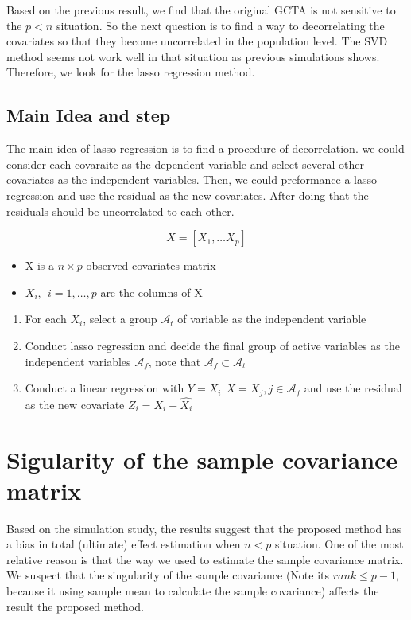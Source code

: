 \documentclass[]{article}
\providecommand{\tightlist}{%
  \setlength{\itemsep}{0pt}\setlength{\parskip}{0pt}}
\begin{document}
Based on the previous result, we find that the original GCTA is not
sensitive to the \(p < n\) situation. So the next question is to find a
way to decorrelating the covariates so that they become uncorrelated in
the population level. The SVD method seems not work well in that
situation as previous simulations shows. Therefore, we look for the
lasso regression method.

\subsection{Main Idea and step}\label{main-idea-and-step}

The main idea of lasso regression is to find a procedure of
decorrelation. we could consider each covaraite as the dependent
variable and select several other covariates as the independent
variables. Then, we could preformance a lasso regression and use the
residual as the new covariates. After doing that the residuals should be
uncorrelated to each other.

\[
  X = [X_1, \dots X_p]
\]

\begin{itemize}
\tightlist
\item
  X is a \(n \times p\) observed covariates matrix
\item
  \(X_i, ~~ i = 1, \dots, p\) are the columns of X
\end{itemize}

\begin{enumerate}
\def\labelenumi{\arabic{enumi}.}
\tightlist
\item
  For each \(X_i\), select a group \(\mathcal{A}_t\) of variable as the
  independent variable
\item
  Conduct lasso regression and decide the final group of active
  variables as the independent variables \(\mathcal{A}_f\), note that
  \(\mathcal{A}_f \subset \mathcal{A}_t\)
\item
  Conduct a linear regression with
  \(Y = X_i ~~ X = X_j, j\in\mathcal{A}_f\) and use the residual as the
  new covariate \(Z_i = X_i - \hat{X_i}\)
\end{enumerate}

\section{Sigularity of the sample covariance
matrix}\label{sigularity-of-the-sample-covariance-matrix}

Based on the simulation study, the results suggest that the proposed
method has a bias in total (ultimate) effect estimation when \(n<p\)
situation. One of the most relative reason is that the way we used to
estimate the sample covariance matrix. We suspect that the singularity
of the sample covariance (Note its \(rank \leq p-1\), because it using
sample mean to calculate the sample covariance) affects the result the
proposed method.
\end{document}
